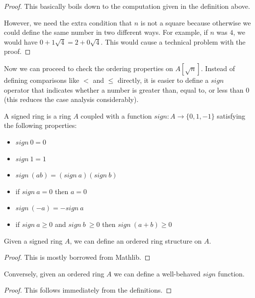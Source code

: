 \begin{proof}
  \leanok
  This basically boils down to the computation given in the definition above.

  However, we need the extra condition that $n$ is not a square because
  otherwise we could define the same number in two different ways. For example,
  if $n$ was $4$, we would have $0 + 1\sqrt{4} = 2 + 0\sqrt{4}$. This would
  cause a technical problem with the proof.
\end{proof}


Now we can proceed to check the ordering properties on $A[\sqrt{n}]$. Instead
of defining comparisons like $<$ and $≤$ directly, it is easier to define a
$sign$ operator that indicates whether a number is greater than, equal to,
or less than 0 (this reduces the case analysis considerably).

\begin{definition}
  \label{def:signedRing}
  \leanok
  A signed ring is a ring $A$ coupled with a function $sign : A → \{0, 1, -1\}$
  satisfying the following properties: \begin{itemize}
    \item $sign~0 = 0$
    \item $sign~1 = 1$
    \item $sign~(ab) = (sign~a)(sign~b)$
    \item if $sign~a = 0$ then $a = 0$
    \item $sign~(-a) = -sign~a$
    \item if $sign~a \geq 0$ and $sign~b~\geq 0$ then $sign~(a + b) \geq 0$
  \end{itemize}
\end{definition}

\begin{lemma}
  \label{thm:orderFromSign}
  \leanok
  Given a signed ring $A$, we can define an ordered ring structure on $A$.
\end{lemma}
\begin{proof}
  \leanok
  This is mostly borrowed from Mathlib.
\end{proof}
\begin{lemma}
  \label{thm:signFromOrder}
  \leanok
  Conversely, given an ordered ring $A$ we can define a well-behaved $sign$
  function.
\end{lemma}
\begin{proof}
  \leanok
  This follows immediately from the definitions.
\end{proof}

